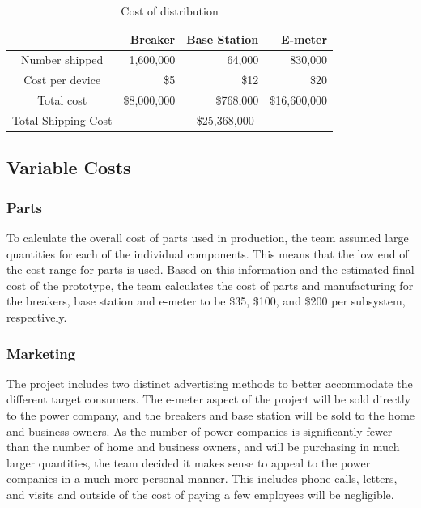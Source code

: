 \begin{table}[htdp]
\caption{Cost of distribution}
\begin{center}
\begin{tabular}{|c|r|r|r|}\hline\rowcolor{lightgray}
	                            & Breaker	    & Base Station & E-meter\\\hline
Number shipped	& 1,600,000 & 64,000           & 830,000\\\hline
Cost per device         & \$5	     & \$12               & \$20          \\\hline
Total cost	                   & \$8,000,000   & \$768,000         & \$16,600,000\\\hline
			
Total Shipping Cost	&	\multicolumn{3}{|c|}{\$25,368,000}\\\hline
\end{tabular}
\end{center}
\label{tab:distribution_costs}
\end{table}%


\subsection{Variable Costs}
\subsubsection{Parts}
To calculate the overall cost of parts used in production, the team assumed large quantities for each of the individual components. This means that the low end of the cost range for parts is used. Based on this information and the estimated final cost of the prototype, the team calculates the cost of parts and manufacturing for the breakers, base station and e-meter to be \$35, \$100, and \$200 per subsystem, respectively.




\subsubsection{Marketing}
The project includes two distinct advertising methods to better accommodate the different target consumers. The e-meter aspect of the project will be sold directly to the power company, and the breakers and base station will be sold to the home and business owners. As the number of power companies is significantly fewer than the number of home and business owners, and will be purchasing in much larger quantities, the team decided it makes sense to appeal to the power companies in a much more personal manner. This includes phone calls, letters, and visits and outside of the cost of paying a few employees will be negligible. 

